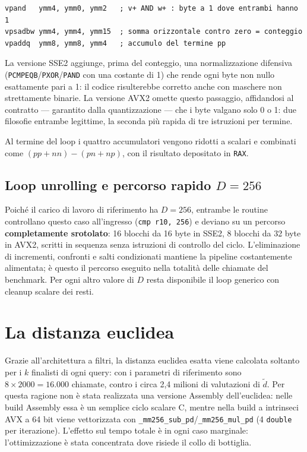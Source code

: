 \begin{verbatim}
vpand   ymm4, ymm0, ymm2   ; v+ AND w+ : byte a 1 dove entrambi hanno 1
vpsadbw ymm4, ymm4, ymm15  ; somma orizzontale contro zero = conteggio
vpaddq  ymm8, ymm8, ymm4   ; accumulo del termine pp
\end{verbatim}

La versione SSE2 aggiunge, prima del conteggio, una normalizzazione difensiva (\texttt{PCMPEQB}/\texttt{PXOR}/\texttt{PAND} con una costante di 1) che rende ogni byte non nullo esattamente pari a 1: il codice risulterebbe corretto anche con maschere non strettamente binarie. La versione AVX2 omette questo passaggio, affidandosi al contratto — garantito dalla quantizzazione — che i byte valgano solo 0 o 1: due filosofie entrambe legittime, la seconda più rapida di tre istruzioni per termine.

Al termine del loop i quattro accumulatori vengono ridotti a scalari e combinati come $(pp + nn) - (pn + np)$, con il risultato depositato in \texttt{RAX}.

\subsection{Loop unrolling e percorso rapido $D=256$}
Poiché il carico di lavoro di riferimento ha $D=256$, entrambe le routine controllano questo caso all'ingresso (\texttt{cmp r10, 256}) e deviano su un percorso \textbf{completamente srotolato}: 16 blocchi da 16 byte in SSE2, 8 blocchi da 32 byte in AVX2, scritti in sequenza senza istruzioni di controllo del ciclo. L'eliminazione di incrementi, confronti e salti condizionati mantiene la pipeline costantemente alimentata; è questo il percorso eseguito nella totalità delle chiamate del benchmark. Per ogni altro valore di $D$ resta disponibile il loop generico con cleanup scalare dei resti.

\section{La distanza euclidea}
Grazie all'architettura a filtri, la distanza euclidea esatta viene calcolata soltanto per i $k$ finalisti di ogni query: con i parametri di riferimento sono $8 \times 2000 = 16.000$ chiamate, contro i circa 2,4 milioni di valutazioni di $\tilde{d}$. Per questa ragione non è stata realizzata una versione Assembly dell'euclidea: nelle build Assembly essa è un semplice ciclo scalare C, mentre nella build a intrinseci AVX a 64 bit viene vettorizzata con \texttt{\_mm256\_sub\_pd}/\texttt{\_mm256\_mul\_pd} (4 \texttt{double} per iterazione). L'effetto sul tempo totale è in ogni caso marginale: l'ottimizzazione è stata concentrata dove risiede il collo di bottiglia.

